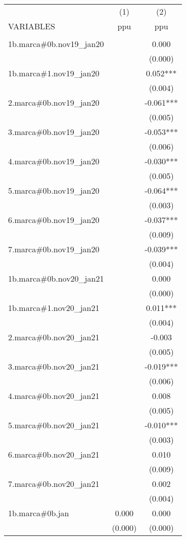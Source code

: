 \begin{tabular}{lcc} \hline
 & (1) & (2) \\
VARIABLES & ppu & ppu \\ \hline
 &  &  \\
1b.marca\#0b.nov19\_jan20 &  & 0.000 \\
 &  & (0.000) \\
1b.marca\#1.nov19\_jan20 &  & 0.052*** \\
 &  & (0.004) \\
2.marca\#0b.nov19\_jan20 &  & -0.061*** \\
 &  & (0.005) \\
3.marca\#0b.nov19\_jan20 &  & -0.053*** \\
 &  & (0.006) \\
4.marca\#0b.nov19\_jan20 &  & -0.030*** \\
 &  & (0.005) \\
5.marca\#0b.nov19\_jan20 &  & -0.064*** \\
 &  & (0.003) \\
6.marca\#0b.nov19\_jan20 &  & -0.037*** \\
 &  & (0.009) \\
7.marca\#0b.nov19\_jan20 &  & -0.039*** \\
 &  & (0.004) \\
1b.marca\#0b.nov20\_jan21 &  & 0.000 \\
 &  & (0.000) \\
1b.marca\#1.nov20\_jan21 &  & 0.011*** \\
 &  & (0.004) \\
2.marca\#0b.nov20\_jan21 &  & -0.003 \\
 &  & (0.005) \\
3.marca\#0b.nov20\_jan21 &  & -0.019*** \\
 &  & (0.006) \\
4.marca\#0b.nov20\_jan21 &  & 0.008 \\
 &  & (0.005) \\
5.marca\#0b.nov20\_jan21 &  & -0.010*** \\
 &  & (0.003) \\
6.marca\#0b.nov20\_jan21 &  & 0.010 \\
 &  & (0.009) \\
7.marca\#0b.nov20\_jan21 &  & 0.002 \\
 &  & (0.004) \\
1b.marca\#0b.jan & 0.000 & 0.000 \\
 & (0.000) & (0.000) \\

\end{tabular}
